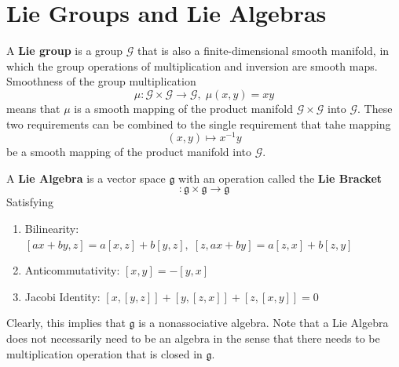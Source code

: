 \section{Lie Groups and Lie Algebras}

  \begin{definition}
    A \textbf{Lie group} is a group $\mathcal{G}$ that is also a finite-dimensional smooth manifold, in which the group operations of multiplication and inversion are smooth maps. Smoothness of the group multiplication
    \begin{equation}
      \mu: \mathcal{G} \times \mathcal{G} \longrightarrow \mathcal{G}, \; \mu(x, y) = x y
    \end{equation}
    means that $\mu$ is a smooth mapping of the product manifold $\mathcal{G} \times \mathcal{G}$ into $\mathcal{G}$. These two requirements can be combined to the single requirement that tahe mapping 
    \begin{equation}
      (x, y) \mapsto x^{-1} y
    \end{equation}
    be a smooth mapping of the product manifold into $\mathcal{G}$. 
  \end{definition}

  \begin{definition}
    A \textbf{Lie Algebra} is a vector space $\mathfrak{g}$ with an operation called the \textbf{Lie Bracket} 
    \begin{equation}
      [\cdot, \cdot]: \mathfrak{g} \times \mathfrak{g} \longrightarrow \mathfrak{g}
    \end{equation}
    Satisfying
    \begin{enumerate}
      \item Bilinearity: $[ax + by, z] = a[x,z] + b[y,z], \; [z, ax + by] = a[z, x] + b[z,y]$
      \item Anticommutativity: $[x,y] = -[y,x]$
      \item Jacobi Identity: $[x,[y,z]] + [y,[z,x]] + [z,[x,y]] = 0$
    \end{enumerate}
    Clearly, this implies that $\mathfrak{g}$ is a nonassociative algebra. Note that a Lie Algebra does not necessarily need to be an algebra in the sense that there needs to be multiplication operation that is closed in $\mathfrak{g}$. 
  \end{definition}

